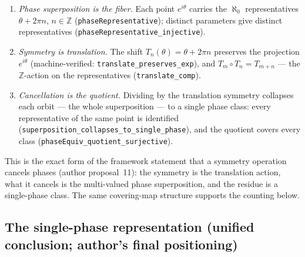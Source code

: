 \documentclass{article}
\begin{document}
\begin{enumerate}
\item \emph{Phase superposition is the fiber.} Each point $e^{i\theta}$
carries the $\aleph_0$ representatives $\theta+2\pi n$, $n\in\mathbb Z$
(\texttt{phaseRepresentative}); distinct parameters give distinct
representatives (\texttt{phaseRepresentative\_injective}).
\item \emph{Symmetry is translation.} The shift
$T_n(\theta)=\theta+2\pi n$ preserves the projection $e^{i\theta}$
(machine-verified: \texttt{translate\_preserves\_exp}), and
$T_m\circ T_n=T_{m+n}$ --- the $\mathbb Z$-action on the representatives
(\texttt{translate\_comp}).
\item \emph{Cancellation is the quotient.} Dividing by the translation
symmetry collapses each orbit --- the whole superposition --- to a single
phase class: every representative of the same point is identified
(\texttt{superposition\_collapses\_to\_single\_phase}), and the quotient
covers every class (\texttt{phaseEquiv\_quotient\_surjective}).
\end{enumerate}

This is the exact form of the framework statement that a symmetry
operation cancels phases (author proposal~11): the symmetry is the
translation action, what it cancels is the multi-valued phase
superposition, and the residue is a single-phase class. The same
covering-map structure supports the counting below.

\subsection*{The single-phase representation (unified conclusion; author's final positioning)}
\end{document}
